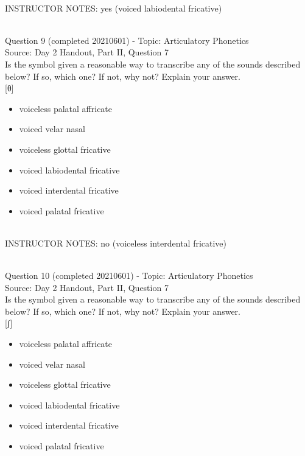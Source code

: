 \documentclass[12pt]{article}
\begin{document}
~\\
INSTRUCTOR NOTES: yes (voiced labiodental fricative)


~\\

{\large Question 9} (completed 20210601) - Topic: Articulatory Phonetics\\
Source: Day 2 Handout, Part II, Question 7\\

Is the symbol given a reasonable way to transcribe any of the sounds described below? If so, which one? If not, why not? Explain your answer.\\

{[θ]}

\begin{itemize} \item voiceless palatal affricate \item voiced velar nasal \item voiceless glottal fricative \item voiced labiodental fricative \item voiced interdental fricative \item voiced palatal fricative \end{itemize}


~\\
INSTRUCTOR NOTES: no (voiceless interdental fricative)


~\\

{\large Question 10} (completed 20210601) - Topic: Articulatory Phonetics\\
Source: Day 2 Handout, Part II, Question 7\\

Is the symbol given a reasonable way to transcribe any of the sounds described below? If so, which one? If not, why not? Explain your answer.\\

{[ʃ]}

\begin{itemize} \item voiceless palatal affricate \item voiced velar nasal \item voiceless glottal fricative \item voiced labiodental fricative \item voiced interdental fricative \item voiced palatal fricative \end{itemize}
\end{document}
